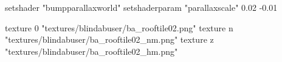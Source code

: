 	setshader "bumpparallaxworld"
	setshaderparam "parallaxscale" 0.02 -0.01

    texture 0 "textures/blindabuser/ba_rooftile02.png"
    texture n "textures/blindabuser/ba_rooftile02_nm.png"
    texture z "textures/blindabuser/ba_rooftile02_hm.png"
